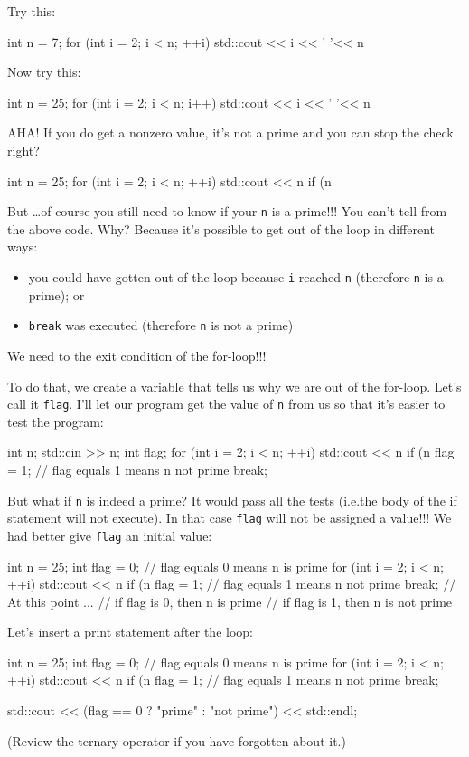 Try this:
\begin{console}
int n = 7;
for (int i = 2; i < n; ++i)
{   
    std::cout << i << ' '<< n %
}
\end{console}
Now try this:
\begin{console}
int n = 25;
for (int i = 2; i < n; i++)
{   
    std::cout << i << ' '<< n %
}
\end{console}
AHA! If you do get a nonzero value, it's not a prime and
you can stop the check right?
\begin{console}
int n = 25;
for (int i = 2; i < n; ++i)
{   
    std::cout << n %
    if (n %
}
\end{console}
But \ldots of course you still need to know if your \texttt{n} is a
prime!!! You can't tell from the above code. Why?
Because it's possible to get out of the loop in
 different ways:

\begin{itemize}
\item
  you could have gotten out of the loop because \texttt{i} reached
  \texttt{n} (therefore \texttt{n} is a prime); or
\item
  \texttt{break} was executed (therefore \texttt{n} is not a prime)
\end{itemize}

We need to  the exit condition of the for-loop!!!

To do that, we create a variable that tells us why we are out of the
for-loop. Let's call it \texttt{flag}.
I'll let our program get the value of \texttt{n} from us
so that it's easier to test the program:
\begin{console}
int n;
std::cin >> n;
int flag;
for (int i = 2; i < n; ++i)
{   
    std::cout << n %
    if (n %
    {
        flag = 1; // flag equals 1 means n not prime
        break;
    }
}
\end{console}

But what if \texttt{n} is indeed a prime? It would pass all the tests
(i.e.the body of the if statement will not execute). In that case
\texttt{flag} will not be assigned a value!!! We had better give
\texttt{flag} an initial value:
\begin{console}
int n = 25;
int flag = 0; // flag equals 0 means n is prime
for (int i = 2; i < n; ++i)
{   
    std::cout << n %
    if (n %
    {
        flag = 1; // flag equals 1 means n not prime
        break;
    }
}
// At this point ...
// if flag is 0, then n is prime
// if flag is 1, then n is not prime \\
\end{console}
Let's insert a print statement after the loop:
\begin{console}
int n = 25;
int flag = 0; // flag equals 0 means n is prime
for (int i = 2; i < n; ++i)
{   
    std::cout << n %
    if (n %
    {
        flag = 1; // flag equals 1 means n not prime
        break;
    }
}

std::cout << (flag == 0 ? "prime" : "not prime")
          << std::endl;
\end{console}
(Review the ternary operator if you have forgotten about it.)

